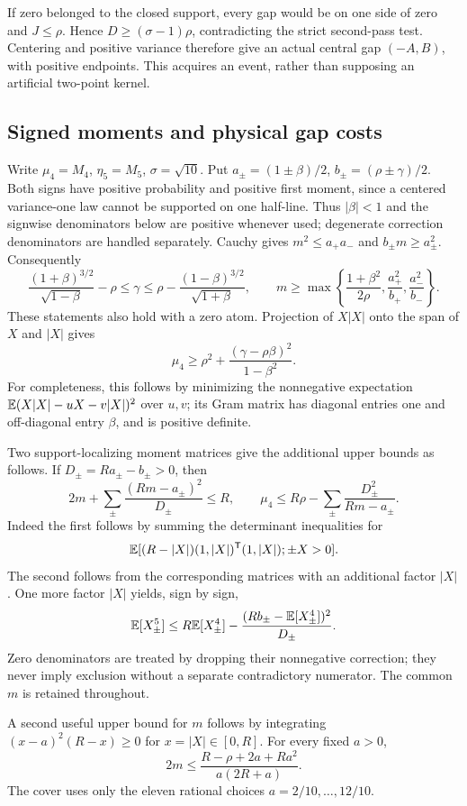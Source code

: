 If zero belonged to the closed support, every gap would be on one side
of zero and $J\le\rho$. Hence $D\ge(\sigma-1)\rho$, contradicting the
strict second-pass test. Centering and positive variance therefore give
an actual central gap $(-A,B)$, with positive endpoints. This acquires
an event, rather than supposing an artificial two-point kernel.

\subsection{Signed moments and physical gap costs}\label{v9:entry:signed-moments}
Write $\mu_4=M_4$, $\eta_5=M_5$, $\sigma=\sqrt{10}$. Put $a_\pm=(1\pm\beta)/2$, $b_\pm=(\rho\pm\gamma)/2$.
Both signs have positive probability and positive first moment, since a
centered variance-one law cannot be supported on one half-line. Thus
$|\beta|<1$ and the signwise denominators below are positive whenever
used; degenerate correction denominators are handled separately.
Cauchy gives $m^2\le a_+a_-$ and $b_\pm m\ge a_\pm^2$.
Consequently
\[
 \frac{(1+\beta)^{3/2}}{\sqrt{1-\beta}}-\rho
 \le\gamma\le
 \rho-\frac{(1-\beta)^{3/2}}{\sqrt{1+\beta}},\qquad
 m\ge\max\left\{\frac{1+\beta^2}{2\rho},
                  \frac{a_+^2}{b_+},\frac{a_-^2}{b_-}\right\}.
\]
These statements also hold with a zero atom. Projection of $X|X|$ onto
the span of $X$ and $|X|$ gives
\[
 \mu_4\ge\rho^2+\frac{(\gamma-\rho\beta)^2}{1-\beta^2}.
\]
For completeness, this follows by minimizing the nonnegative expectation
$\mathbb E(X|X|-uX-v|X|)^2$ over $u,v$; its Gram matrix has diagonal entries
one and off-diagonal entry $\beta$, and is positive definite.

Two support-localizing moment matrices give the additional upper bounds
as follows. If
$D_\pm=Ra_\pm-b_\pm>0$, then
\[
 2m+\sum_\pm\frac{(Rm-a_\pm)^2}{D_\pm}\le R,
 \qquad
 \mu_4\le R\rho-\sum_\pm\frac{D_\pm^2}{Rm-a_\pm}.
\]
Indeed the first follows by summing the determinant inequalities for
\[\mathbb E[(R-|X|)(1,|X|)^{\mathsf T}(1,|X|);\pm X>0].\]
The second follows from the corresponding matrices with an additional
factor $|X|$. One more factor $|X|$ yields, sign by sign,
\[
 \mathbb E[X_\pm^5]\le R \mathbb E[X_\pm^4]
 -\frac{(Rb_\pm-\mathbb E[X_\pm^4])^2}{D_\pm}.
\]
Zero denominators are treated by dropping their nonnegative correction;
they never imply exclusion without a separate contradictory numerator.
The common $m$ is retained throughout.

A second useful upper bound for $m$ follows by integrating
$(x-a)^2(R-x)\ge0$ for $x=|X|\in[0,R]$. For every fixed $a>0$,
\[
 2m\le\frac{R-\rho+2a+Ra^2}{a(2R+a)}.
\]
The cover uses only the eleven rational choices $a=2/10,\ldots,12/10$.

